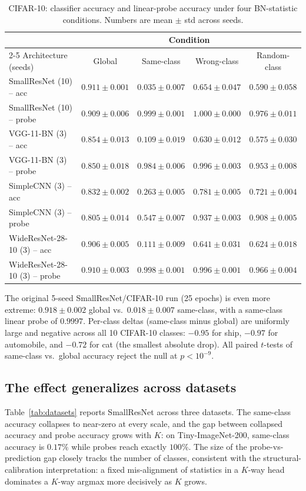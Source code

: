 \documentclass[11pt]{article}
\begin{document}
\begin{table}[t]
\centering
\caption{CIFAR-10: classifier accuracy and linear-probe accuracy under four BN-statistic conditions. Numbers are mean $\pm$ std across seeds.}
\label{tab:cifar10}
\small
\begin{tabular}{lcccc}
\toprule
& \multicolumn{4}{c}{Condition} \\
\cmidrule(lr){2-5}
Architecture (seeds) & Global & Same-class & Wrong-class & Random-class \\
\midrule
SmallResNet (10) -- acc      & $0.911 \pm 0.001$ & $0.035 \pm 0.007$ & $0.654 \pm 0.047$ & $0.590 \pm 0.058$ \\
SmallResNet (10) -- probe    & $0.909 \pm 0.006$ & $0.999 \pm 0.001$ & $1.000 \pm 0.000$ & $0.976 \pm 0.011$ \\
VGG-11-BN (3) -- acc         & $0.854 \pm 0.013$ & $0.109 \pm 0.019$ & $0.630 \pm 0.012$ & $0.575 \pm 0.030$ \\
VGG-11-BN (3) -- probe       & $0.850 \pm 0.018$ & $0.984 \pm 0.006$ & $0.996 \pm 0.003$ & $0.953 \pm 0.008$ \\
SimpleCNN (3) -- acc         & $0.832 \pm 0.002$ & $0.263 \pm 0.005$ & $0.781 \pm 0.005$ & $0.721 \pm 0.004$ \\
SimpleCNN (3) -- probe       & $0.805 \pm 0.014$ & $0.547 \pm 0.007$ & $0.937 \pm 0.003$ & $0.908 \pm 0.005$ \\
WideResNet-28-10 (3) -- acc  & $0.906 \pm 0.005$ & $0.111 \pm 0.009$ & $0.641 \pm 0.031$ & $0.624 \pm 0.018$ \\
WideResNet-28-10 (3) -- probe& $0.910 \pm 0.003$ & $0.998 \pm 0.001$ & $0.996 \pm 0.001$ & $0.966 \pm 0.004$ \\
\bottomrule
\end{tabular}
\end{table}

The original 5-seed SmallResNet/CIFAR-10 run (25 epochs) is even more extreme: $0.918 \pm 0.002$ global vs.\ $0.018 \pm 0.007$ same-class, with a same-class linear probe of $0.9997$. Per-class deltas (same-class minus global) are uniformly large and negative across all 10 CIFAR-10 classes: $-0.95$ for ship, $-0.97$ for automobile, and $-0.72$ for cat (the smallest absolute drop). All paired $t$-tests of same-class vs.\ global accuracy reject the null at $p < 10^{-9}$.

\subsection{The effect generalizes across datasets}
Table~\ref{tab:datasets} reports SmallResNet across three datasets. The same-class accuracy collapses to near-zero at every scale, and the gap between collapsed accuracy and probe accuracy grows with $K$: on Tiny-ImageNet-200, same-class accuracy is $0.17\%$ while probes reach exactly $100\%$. The size of the probe-vs-prediction gap closely tracks the number of classes, consistent with the structural-calibration interpretation: a fixed mis-alignment of statistics in a $K$-way head dominates a $K$-way argmax more decisively as $K$ grows.
\end{document}
